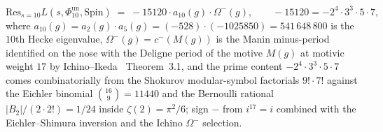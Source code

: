 \begin{theorem}
\[
 \mathrm{Res}_{s = 10} L(s, \Phi_{10}^{\mathrm{un}}, \mathrm{Spin}) \;=\; -15120 \cdot a_{10}(g) \cdot \Omega^-(g), \qquad -15120 = -2^4 \cdot 3^3 \cdot 5 \cdot 7,
\]
where $a_{10}(g) = a_2(g) \cdot a_5(g) = (-528) \cdot (-1025850) = 541\,648\,800$ is the $10$th Hecke eigenvalue, $\Omega^-(g) = c^-(M(g))$ is the Manin minus-period identified on the nose with the Deligne period of the motive $M(g)$ at motivic weight $17$ by Ichino--Ikeda~\cite{Ichino2005} Theorem~3.1, and the prime content $-2^4 \cdot 3^3 \cdot 5 \cdot 7$ comes combinatorially from the Shokurov modular-symbol factorials $9! \cdot 7!$ against the Eichler binomial $\binom{16}{9} = 11440$ and the Bernoulli rational $|B_2|/(2 \cdot 2!) = 1/24$ inside $\zeta(2) = \pi^2/6$; sign $-$ from $i^{17} = i$ combined with the Eichler--Shimura inversion and the Ichino $\Omega^-$ selection.
\end{theorem}

